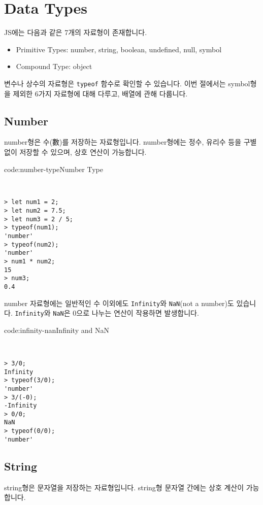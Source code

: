 \section{Data Types} \label{sect:data-types}

JS에는 다음과 같은 7개의 자료형이 존재합니다. 

\begin{itemize}
    \item Primitive Types: number, string, boolean, undefined, null, symbol
    \item Compound Type: object
\end{itemize}

변수나 상수의 자료형은 \texttt{typeof} 함수로 확인할 수 있습니다. 이번 절에서는 symbol형을 제외한 6가지 자료형에 대해 다루고, 배열에 관해 다룹니다. 

\subsection*{Number}

number형은 수(數)를 저장하는 자료형입니다. number형에는 정수, 유리수 등을 구별 없이 저장할 수 있으며, 상호 연산이 가능합니다.

\begin{codeenv}{code:number-type}{Number Type}\begin{verbatim}


> let num1 = 2;
> let num2 = 7.5;
> let num3 = 2 / 5;
> typeof(num1);
'number'
> typeof(num2);
'number'
> num1 * num2;
15
> num3;
0.4
\end{verbatim}
\end{codeenv}

number 자료형에는 일반적인 수 이외에도 \texttt{Infinity}와 \texttt{NaN}(not a number)도 있습니다. \texttt{Infinity}와 \texttt{NaN}은 0으로 나누는 연산이 작용하면 발생합니다. 

\begin{codeenv}{code:infinity-nan}{Infinity and NaN}\begin{verbatim}


> 3/0;
Infinity
> typeof(3/0);
'number'
> 3/(-0);
-Infinity
> 0/0;
NaN
> typeof(0/0);
'number'
\end{verbatim}
\end{codeenv}

\subsection*{String}

string형은 문자열을 저장하는 자료형입니다. string형 문자열 간에는 상호 계산이 가능합니다.

